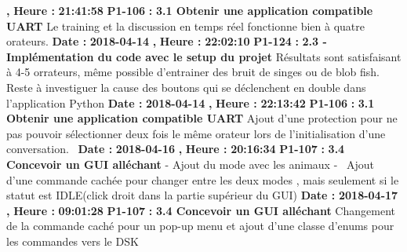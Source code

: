 \documentclass{article}%
\begin{document}
\textbf{,}%
\textbf{ Heure : }%
\textbf{21:41:58}%
\newline%
%
\textbf{P1{-}106 }%
\textbf{ : }%
\textbf{ 3.1 Obtenir une application compatible UART}%
\newline%
\newline%
%
Le training et la discussion en temps réel fonctionne bien à quatre orateurs.\newline%
\newline%
%
\textbf{Date : }%
\textbf{2018{-}04{-}14}%
\textbf{,}%
\textbf{ Heure : }%
\textbf{22:02:10}%
\newline%
%
\textbf{P1{-}124 }%
\textbf{ : }%
\textbf{ 2.3 {-} Implémentation du code avec le setup du projet}%
\newline%
\newline%
%
Résultats sont satisfaisant à 4{-}5 orrateurs, même possible d'entrainer des bruit de singes ou de blob fish.~\newline%
Reste à investiguer la cause des boutons qui se déclenchent en double dans l'application Python\newline%
\newline%
%
\textbf{Date : }%
\textbf{2018{-}04{-}14}%
\textbf{,}%
\textbf{ Heure : }%
\textbf{22:13:42}%
\newline%
%
\textbf{P1{-}106 }%
\textbf{ : }%
\textbf{ 3.1 Obtenir une application compatible UART}%
\newline%
\newline%
%
Ajout d'une protection pour ne pas pouvoir sélectionner deux fois le même orateur lors de l'initialisation d'une conversation.~\newline%
\newline%
%
\textbf{Date : }%
\textbf{2018{-}04{-}16}%
\textbf{,}%
\textbf{ Heure : }%
\textbf{20:16:34}%
\newline%
%
\textbf{P1{-}107 }%
\textbf{ : }%
\textbf{ 3.4 Concevoir un GUI alléchant}%
\newline%
\newline%
%
{-} Ajout du mode avec les animaux\newline%
{-}~ Ajout d'une commande cachée pour changer entre les deux modes , mais seulement si le statut est IDLE(click droit dans la partie supérieur du GUI)\newline%
\newline%
%
\textbf{Date : }%
\textbf{2018{-}04{-}17}%
\textbf{,}%
\textbf{ Heure : }%
\textbf{09:01:28}%
\newline%
%
\textbf{P1{-}107 }%
\textbf{ : }%
\textbf{ 3.4 Concevoir un GUI alléchant}%
\newline%
\newline%
%
Changement de la commande caché pour un pop{-}up menu et ajout d'une classe d'enums pour les commandes vers le DSK\newline%
\newline%
%
\newpage
\end{document}
